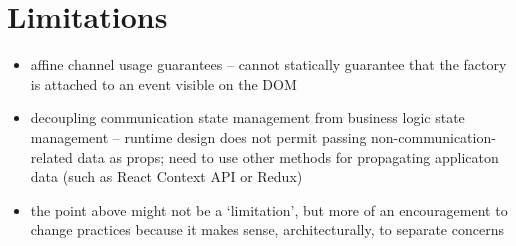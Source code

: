 \section{Limitations}
\begin{itemize}
\item affine channel usage guarantees -- cannot statically guarantee that the factory is attached to an event visible on the DOM
\item decoupling communication state management from business logic state management -- runtime design does not permit passing non-communication-related data as props; need to use other methods for propagating applicaton data (such as React Context API or Redux)
\item the point above might not be a `limitation', but more of an encouragement to change practices because it makes sense, architecturally, to separate concerns
\end{itemize}
